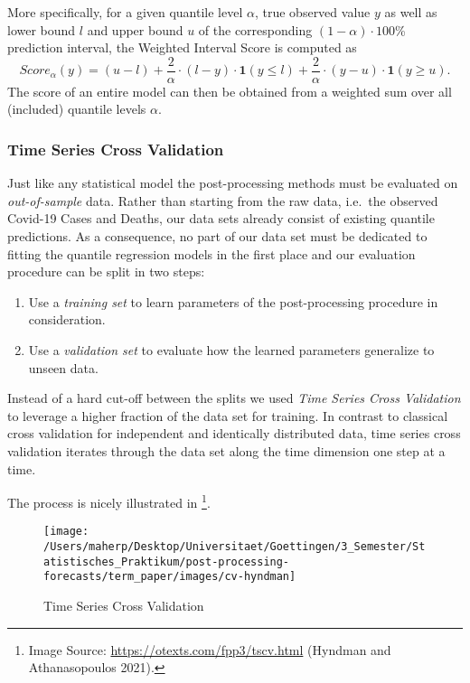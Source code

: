 \documentclass[
]{article}
\begin{document}
More specifically, for a given quantile level \(\alpha\), true observed value \(y\) as well as lower bound \(l\) and upper bound \(u\) of the corresponding \((1 - \alpha) \cdot 100\)\% prediction interval, the Weighted Interval Score is computed as
\[
\begin{equation}
Score_\alpha(y) 
= (u-l) + \frac{2}{\alpha} \cdot (l-y) \cdot \mathbf{1} (y \leq l) + \frac{2}{\alpha} \cdot (y-u) \cdot \mathbf{1}(y \geq u).
\label{eq:binom}
\end{equation}
\]
The score of an entire model can then be obtained from a weighted sum over all (included) quantile levels \(\alpha\).

\hypertarget{time-series-cross-validation}{%
\subsubsection{Time Series Cross Validation}\label{time-series-cross-validation}}

Just like any statistical model the post-processing methods must be evaluated on \emph{out-of-sample} data.
Rather than starting from the raw data, i.e.~the observed Covid-19 Cases and Deaths, our data sets already consist of existing quantile predictions.
As a consequence, no part of our data set must be dedicated to fitting the quantile regression models in the first place and our evaluation procedure can be split in two steps:

\begin{enumerate}
\def\labelenumi{\arabic{enumi}.}
\item
  Use a \emph{training set} to learn parameters of the post-processing procedure in consideration.
\item
  Use a \emph{validation set} to evaluate how the learned parameters generalize to unseen data.
\end{enumerate}

Instead of a hard cut-off between the splits we used \emph{Time Series Cross Validation} to leverage a higher fraction of the data set for training.
In contrast to classical cross validation for independent and identically distributed data, time series cross validation iterates through the data set along the time dimension one step at a time.

The process is nicely illustrated in \footnote{Image Source: \url{https://otexts.com/fpp3/tscv.html} (Hyndman and Athanasopoulos 2021).}.

\begin{figure}

{\centering \texttt{[image: /Users/maherp/Desktop/Universitaet/Goettingen/3\_Semester/Statistisches\_Praktikum/post-processing-forecasts/term\_paper/images/cv-hyndman]} 

}

\caption{Time Series Cross Validation}\label{fig:ch1-cv}
\end{figure}
\end{document}
